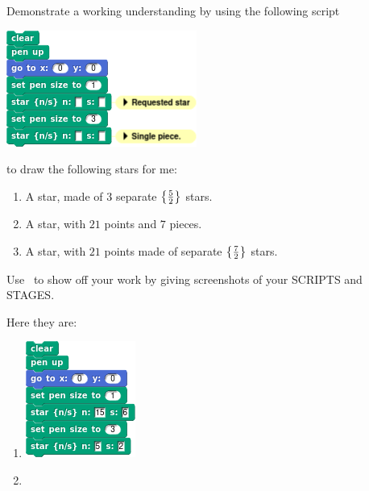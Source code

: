 \documentclass[noauthor,nooutcomes,12pt,hints,handout]{ximera}
\begin{document}
\begin{question}
  Demonstrate a working understanding by using the following script
  \begin{center}
    \includegraphics{starsSubBLANKScript.png}
  \end{center}
  to draw the following stars for me:
  \begin{enumerate}
  \item A star, made of $3$ separate $\left\{\frac{5}{2}\right\}$ stars.
   \item A star, with $21$ points and $7$ pieces. 
   \item A star, with $21$ points made of separate $\left\{\frac{7}{2}\right\}$
     stars.
  \end{enumerate}
  Use \snap\ to show off your work by giving screenshots of your
  SCRIPTS and STAGES.
  \begin{freeResponse}
    Here they are:
    \begin{enumerate}
    \item
      \begin{center}
        \includegraphics[width=.3\textwidth]{starsSub15-5-2Script.png}   \qquad {}
      \end{center}
    \item

\end{enumerate}
\end{freeResponse}
\end{question}
\end{document}
